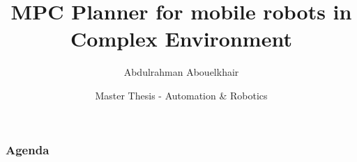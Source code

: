 \documentclass[aspectratio=1610, professionalfonts, 9pt]{beamer}
\title[MPC-Planner]{MPC Planner for mobile robots in Complex Environment}
\author[A.~Abouelkhair]{Abdulrahman Abouelkhair}
\institute[FLW]{\small Lehrstuhl für Förder- und Lagerwesen \\  Fakultät Maschinenbau}
\date[SoSe 2019]{Master Thesis - Automation \& Robotics}
\begin{document}
\maketitle

\begin{frame}
    \frametitle{\Huge Agenda}
    \LARGE
    \tableofcontents
\end{frame}

%

%


%


%











\end{document}
